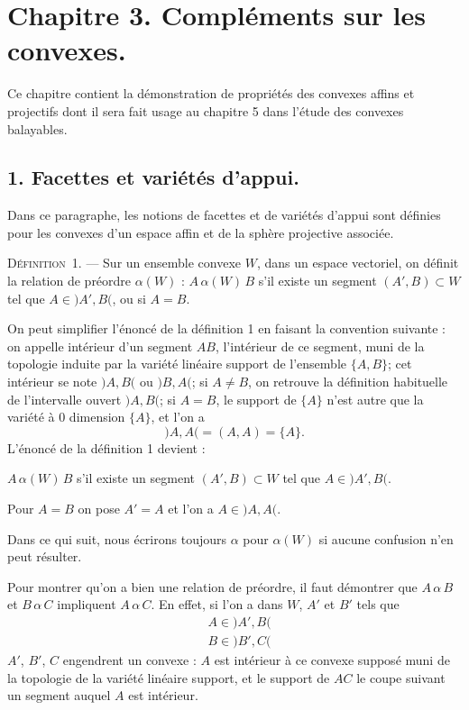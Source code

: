 \documentclass[11pt]{article}
\newcommand{\bznum}[1]{\if\relax\detokenize{#1}\relax\else\ #1\fi}
\newenvironment{defin}[1][]{\par\medskip\noindent\textsc{Définition\bznum{#1}.} --- }{\par\medskip}
\newenvironment{proof}[1][]{\par}{\par}
\begin{document}
\section*{Chapitre 3. Compléments sur les convexes.}

Ce chapitre contient la démonstration de propriétés des convexes affins et projectifs dont il sera
fait usage au chapitre 5 dans l'étude des convexes balayables.

\subsection*{1. Facettes et variétés d'appui.}

Dans ce paragraphe, les notions de facettes et de variétés d'appui sont définies pour les convexes
d'un espace affin et de la sphère projective associée.

\begin{defin}[1]
Sur un ensemble convexe $W$, dans un espace vectoriel, on définit la relation de préordre
$\alpha(W)$ : $A\,\alpha(W)\,B$ s'il existe un segment $(A', B)\subset W$ tel que
$A\in)A', B($, ou si $A=B$.
\end{defin}

On peut simplifier l'énoncé de la définition 1 en faisant la convention suivante : on appelle
intérieur d'un segment $AB$, l'intérieur de ce segment, muni de la topologie induite par la
variété linéaire support de l'ensemble $\{A, B\}$; cet intérieur se note $)A, B($ ou $)B, A($; si
$A\neq B$, on retrouve la définition habituelle de l'intervalle ouvert $)A, B($; si $A=B$, le
support de $\{A\}$ n'est autre que la variété à $0$ dimension $\{A\}$, et l'on a
\[ )A, A(=(A, A)=\{A\}. \]
L'énoncé de la définition 1 devient :

$A\,\alpha(W)\,B$ s'il existe un segment $(A', B)\subset W$ tel que $A\in)A', B($.

Pour $A=B$ on pose $A'=A$ et l'on a $A\in)A, A($.

Dans ce qui suit, nous écrirons toujours $\alpha$ pour $\alpha(W)$ si aucune confusion n'en peut
résulter.

\begin{proof}
Pour montrer qu'on a bien une relation de préordre, il faut démontrer
que $A\,\alpha\,B$ et $B\,\alpha\,C$ impliquent $A\,\alpha\,C$. En effet, si l'on a dans $W$,
$A'$ et $B'$ tels que
\[ \begin{aligned} &A\in)A', B(\\ &B\in)B', C( \end{aligned} \]
$A'$, $B'$, $C$ engendrent un convexe : $A$ est intérieur à ce convexe supposé muni de la
topologie de la variété linéaire support, et le support de $AC$ le coupe suivant un segment
auquel $A$ est intérieur.
\end{proof}
\end{document}
